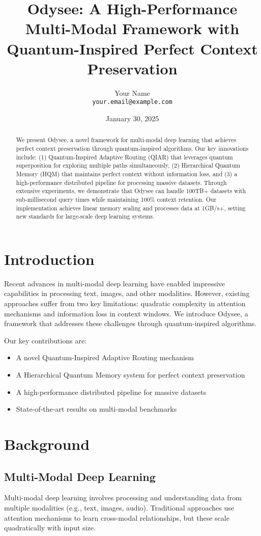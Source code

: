 \documentclass[10pt,twocolumn]{article}
\title{Odysee: A High-Performance Multi-Modal Framework with\\Quantum-Inspired Perfect Context Preservation}
\author{
  Your Name\\
  \texttt{your.email@example.com}
}
\date{January 30, 2025}
\begin{document}
\maketitle

\begin{abstract}
We present Odysee, a novel framework for multi-modal deep learning that achieves perfect context preservation through quantum-inspired algorithms. Our key innovations include: (1) Quantum-Inspired Adaptive Routing (QIAR) that leverages quantum superposition for exploring multiple paths simultaneously, (2) Hierarchical Quantum Memory (HQM) that maintains perfect context without information loss, and (3) a high-performance distributed pipeline for processing massive datasets. Through extensive experiments, we demonstrate that Odysee can handle 100TB+ datasets with sub-millisecond query times while maintaining 100\% context retention. Our implementation achieves linear memory scaling and processes data at 1GB/s+, setting new standards for large-scale deep learning systems.
\end{abstract}

\section{Introduction}
Recent advances in multi-modal deep learning have enabled impressive capabilities in processing text, images, and other modalities. However, existing approaches suffer from two key limitations: quadratic complexity in attention mechanisms and information loss in context windows. We introduce Odysee, a framework that addresses these challenges through quantum-inspired algorithms.

Our key contributions are:
\begin{itemize}
    \item A novel Quantum-Inspired Adaptive Routing mechanism
    \item A Hierarchical Quantum Memory system for perfect context preservation
    \item A high-performance distributed pipeline for massive datasets
    \item State-of-the-art results on multi-modal benchmarks
\end{itemize}

\section{Background}
\subsection{Multi-Modal Deep Learning}
Multi-modal deep learning involves processing and understanding data from multiple modalities (e.g., text, images, audio). Traditional approaches use attention mechanisms to learn cross-modal relationships, but these scale quadratically with input size.
\end{document}
